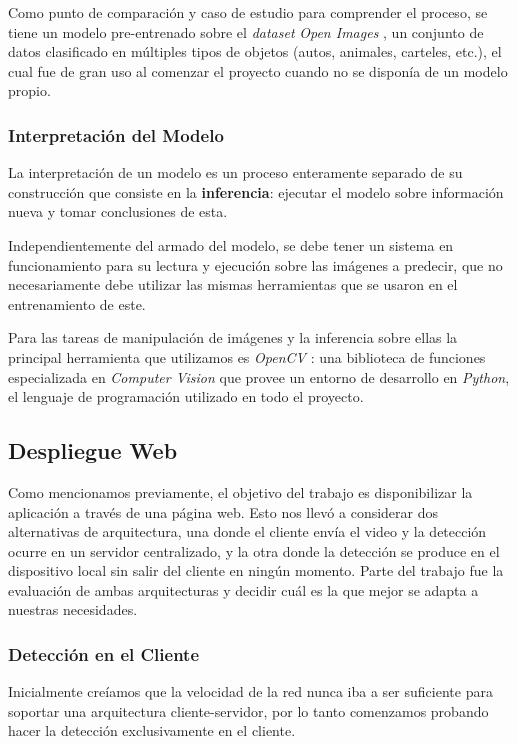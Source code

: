 \documentclass[a4paper]{article}
\begin{document}
Como punto de comparación y caso de estudio para comprender el proceso, se tiene un modelo pre-entrenado sobre el \textit{dataset} \textit{Open Images} \cite{openimages}, un conjunto de datos clasificado en múltiples tipos de objetos (autos, animales, carteles, etc.), el cual fue de gran uso al comenzar el proyecto cuando no se disponía de un modelo propio.

\subsubsection{Interpretación del Modelo}

La interpretación de un modelo es un proceso enteramente separado de su construcción que consiste en la \textbf{inferencia}: ejecutar el modelo sobre información nueva y tomar conclusiones de esta.

Independientemente del armado del modelo, se debe tener un sistema en funcionamiento para su lectura y ejecución sobre las imágenes a predecir, que no necesariamente debe utilizar las mismas herramientas que se usaron en el entrenamiento de este.

Para las tareas de manipulación de imágenes y la inferencia sobre ellas la principal herramienta que utilizamos es \textit{OpenCV} \cite{opencv}: una biblioteca de funciones especializada en \textit{Computer Vision} que provee un entorno de desarrollo en \textit{Python}, el lenguaje de programación utilizado en todo el proyecto.

\subsection{Despliegue Web}

Como mencionamos previamente, el objetivo del trabajo es disponibilizar la aplicación a través de una página web. Esto nos llevó a considerar dos alternativas de arquitectura, una donde el cliente envía el video y la detección ocurre en un servidor centralizado, y la otra donde la detección se produce en el dispositivo local sin salir del cliente en ningún momento. Parte del trabajo fue la evaluación de ambas arquitecturas y decidir cuál es la que mejor se adapta a nuestras necesidades.

\subsubsection{Detección en el Cliente}

Inicialmente creíamos que la velocidad de la red nunca iba a ser suficiente para soportar una arquitectura cliente-servidor, por lo tanto comenzamos probando hacer la detección exclusivamente en el cliente.
\end{document}
